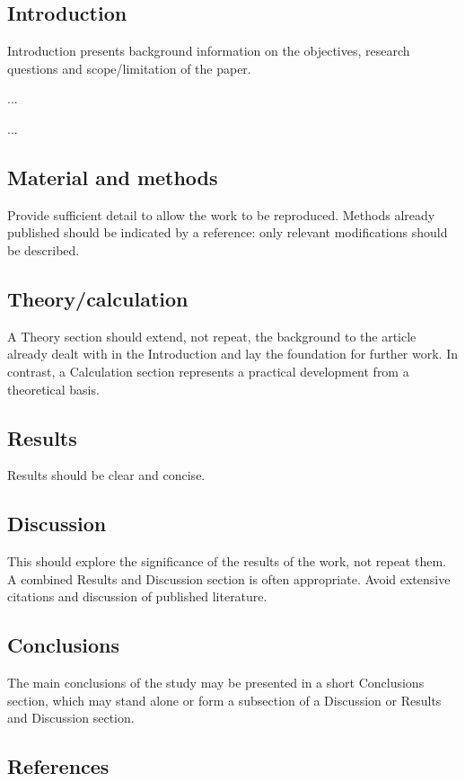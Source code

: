 \documentclass[11pt,a4paper,twoside,twocolumn]{article}
\begin{document}
\subsection{Introduction}
Introduction presents background information on the objectives, research questions and scope/limitation of the paper. 

...

...

\subsection{Material and methods}
Provide sufficient detail to allow the work to be reproduced. Methods already published should be indicated by a reference: only relevant modifications should be described.

\subsection{Theory/calculation}
A Theory section should extend, not repeat, the background to the article already dealt with in the Introduction and lay the foundation for further work. In contrast, a Calculation section represents a practical development from a theoretical basis.

\subsection{Results}
Results should be clear and concise.

\subsection{Discussion}
This should explore the significance of the results of the work, not repeat them. A combined Results and Discussion section is often appropriate. Avoid extensive citations and discussion of published literature.

\subsection{Conclusions}
The main conclusions of the study may be presented in a short Conclusions section, which may stand alone or form a subsection of a Discussion or Results and Discussion section.

\subsection{References} 
\end{document}
